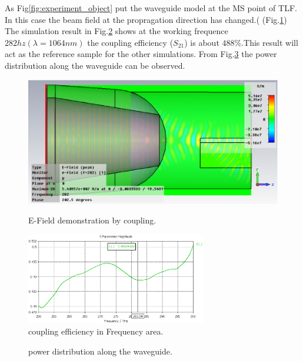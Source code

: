 As Fig\ref{fig:experiment_object} put  the  waveguide model at the MS point of TLF. In this case the beam field at the propragation direction has changed.( (Fig.\ref{fig:coupling_e_field}) The simulation result in Fig.\ref{fig:orignial_coupling_efficiency} shows at the working frequence $282hz(\lambda=1064 nm)$ the coupling efficiency ($S_{21}$) is about $488\%$.This result will act as the reference sample for the other simulations. From Fig.\ref{fig:power_distribution} the power distribution along the waveguide can be observed. 
\begin{figure}
\centering
	\includegraphics[width=0.5 \textwidth]{bilder/basic_waveguide_efield}
	\label{fig:coupling_e_field}
	\caption{E-Field demonstration by  coupling.}
\end{figure}
\begin{figure}
\centering
\includegraphics[width=0.7\textwidth]{bilder/cst_basic_waveguide_S21}
\caption{coupling efficiency in Frequency area.}
\label{fig:orignial_coupling_efficiency}
\end{figure}
\begin{figure}
\centering
\caption{power distribution along the waveguide.}
\label{fig:power_distribution}
\end{figure}

